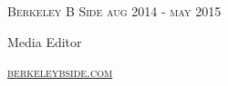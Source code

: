 {
  \textsc{\small{Berkeley B Side
      \hfill
      {\raggedleft
        aug 2014 - may 2015
      }
    }
  }

  {\raggedright\large {
    Media Editor
  } \\}

  \textsc{\small\href{http://www.berkeleybside.com}{berkeleybside.com}}

  \vspace{8pt}
}
